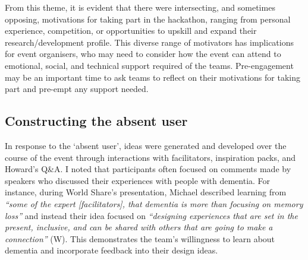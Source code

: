 From this theme, it is evident that there were intersecting, and sometimes opposing, motivations for taking part in the hackathon, ranging from personal experience, competition, or opportunities to upskill and expand their research/development profile. This diverse range of motivators has implications for event organisers, who may need to consider how the event can attend to emotional, social, and technical support required of the teams. Pre-engagement may be an important time to ask teams to reflect on their motivations for taking part and pre-empt any support needed. 


\subsection{Constructing the absent user}
\label{ThemeTwo:AbsentUser}
In response to the `absent user', ideas were generated and developed over the course of the event through interactions with facilitators, inspiration packs, and Howard’s Q\&A. I noted that participants often focused on comments made by speakers who discussed their experiences with people with dementia. For instance, during World Share’s presentation, Michael described learning from \textit{``some of the expert [facilitators], that dementia is more than focusing on memory loss''} and instead their idea focused on \textit{``designing experiences that are set in the present, inclusive, and can be shared with others that are going to make a connection''} (W). This demonstrates the team’s willingness to learn about dementia and incorporate feedback into their design ideas.

